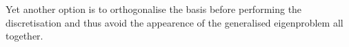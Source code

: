 Yet another option is to orthogonalise the basis before performing
the discretisation and thus avoid the appearence of the generalised
eigenproblem all together.


%




